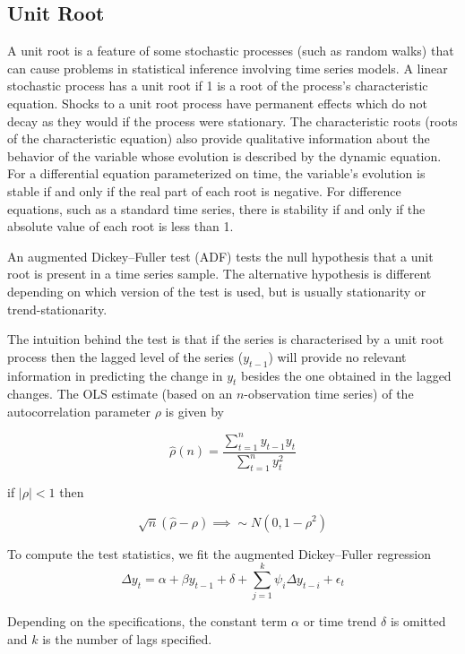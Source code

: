 \documentclass[
  11pt,
]{article}
\numberwithin{equation}{section}
\begin{document}
\hypertarget{unit-root}{%
\subsection{Unit Root}\label{unit-root}}

A unit root is a feature of some stochastic processes (such as random
walks) that can cause problems in statistical inference involving time
series models. A linear stochastic process has a unit root if 1 is a
root of the process's characteristic equation. Shocks to a unit root
process have permanent effects which do not decay as they would if the
process were stationary. The characteristic roots (roots of the
characteristic equation) also provide qualitative information about the
behavior of the variable whose evolution is described by the dynamic
equation. For a differential equation parameterized on time, the
variable's evolution is stable if and only if the real part of each root
is negative. For difference equations, such as a standard time series,
there is stability if and only if the absolute value of each root is
less than 1.

An augmented Dickey--Fuller test (ADF) tests the null hypothesis that a
unit root is present in a time series sample. The alternative hypothesis
is different depending on which version of the test is used, but is
usually stationarity or trend-stationarity.

The intuition behind the test is that if the series is characterised by
a unit root process then the lagged level of the series (\(y_{t-1}\))
will provide no relevant information in predicting the change in
\(y_{t}\) besides the one obtained in the lagged changes. The OLS
estimate (based on an \(n\)-observation time series) of the
autocorrelation parameter \(\rho\) is given by

\[
\hat{\rho}(n) = \frac{\sum\limits_{t=1}^{n}y_{t-1}y_{t}}{\sum\limits_{t=1}^{n}y_{t}^{2}}
\]

if \(\left|\rho \right| < 1\) then

\[
\sqrt{n}\left(\hat{\rho} - \rho\right) \implies \sim{N}(0, 1 - \rho^{2})
\]

To compute the test statistics, we fit the augmented Dickey--Fuller
regression \[
\Delta y_{t} = \alpha + \beta y_{t-1} + \delta + \sum\limits_{j=1}^{k}\psi_{i}\Delta y_{t- i} + \epsilon_{t}
\]

Depending on the specifications, the constant term \(\alpha\) or time
trend \(\delta\) is omitted and \(k\) is the number of lags specified.

  
\end{document}
